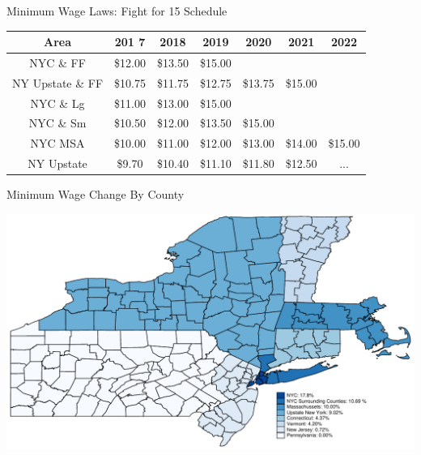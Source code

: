 \documentclass[xcolor=table]{beamer}
\begin{document}
\begin{spacing}{1.2}
\begin{frame}[label=supplemental]{Minimum Wage Laws: Fight for 15 Schedule}
\footnotesize
\centering
\begin{tabular}{ c c c c c c c} \\ \hline \hline
 Area & 201 7& 2018 & 2019 & 2020 & 2021 & 2022 \\ \hline \hline
 NYC \& FF & \$12.00 & \$13.50 & \$15.00 \\
 NY Upstate \& FF  & \$10.75 & \$11.75 & \$12.75 & \$13.75 & \$15.00 \\
NYC \& Lg & \$11.00 & \$13.00 & \$15.00 \\
NYC \& Sm & \$10.50 & \$12.00 & \$13.50 & \$15.00 \\
NYC MSA & \$10.00 & \$11.00 & \$12.00 & \$13.00 & \$14.00 &  \$15.00 \\
NY Upstate &\$9.70 & \$10.40 & \$11.10 &  \$11.80 & \$12.50 & ... \\
\end{tabular}

\bigskip

\raggedleft
\hyperlink{main}{}
\end{frame}


\begin{frame}{Minimum Wage Change By County}

\centering
\includegraphics[scale=.65]{counties.pdf}

\end{frame}


\end{spacing}
\end{document}
